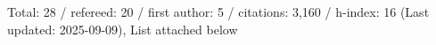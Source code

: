 Total: 28 / refereed: 20 / first author: 5 / citations: 3,160 / h-index: 16 (Last updated: 2025-09-09), List attached below